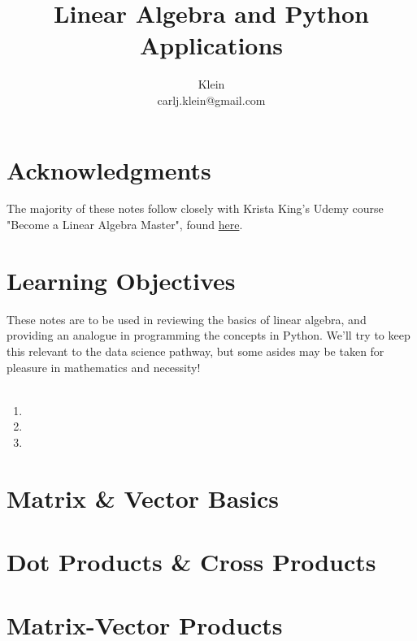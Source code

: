 \documentclass{article}
\begin{document}
	\title{Linear Algebra and Python Applications}
	\author{Klein \\ carlj.klein@gmail.com}
	\date{}
	\maketitle

\section{Acknowledgments}
The majority of these notes follow closely with Krista King's Udemy course "Become a Linear Algebra Master", found \href{https://www.udemy.com/course/linear-algebra-course/}{here}.

\section{Learning Objectives}
These notes are to be used in reviewing the basics of linear algebra, and providing an analogue in programming the concepts in Python. We'll try to keep this relevant to the data science pathway, but some asides may be taken for pleasure in mathematics and necessity!
\\\\

\begin{enumerate}
	\item {}
	\item {}
	\item {}
\end{enumerate}

\section{Matrix \& Vector Basics}\label{sec:concept1}


\section{Dot Products \& Cross Products}\label{sec:concept2}


\section{Matrix-Vector Products}\label{sec:concept3}
\end{document}
